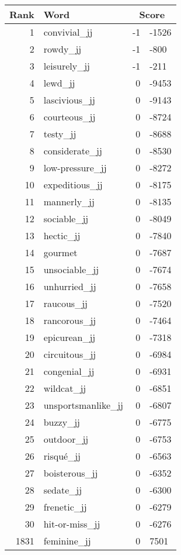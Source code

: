 \begin{longtable}[!htbp]{| rlr@{.}l |}
    \hline
    \textbf{Rank} & \textbf{Word} & \multicolumn{2}{c|}{\textbf{Score}} \\
    \hline
    \endhead
    1 & convivial\_jj & -1 & -1526 \\
    2 & rowdy\_jj & -1 & -800 \\
    3 & leisurely\_jj & -1 & -211 \\
    4 & lewd\_jj & 0 & -9453 \\
    5 & lascivious\_jj & 0 & -9143 \\
    6 & courteous\_jj & 0 & -8724 \\
    7 & testy\_jj & 0 & -8688 \\
    8 & considerate\_jj & 0 & -8530 \\
    9 & low-pressure\_jj & 0 & -8272 \\
    10 & expeditious\_jj & 0 & -8175 \\
    11 & mannerly\_jj & 0 & -8135 \\
    12 & sociable\_jj & 0 & -8049 \\
    13 & hectic\_jj & 0 & -7840 \\
    14 & gourmet & 0 & -7687 \\
    15 & unsociable\_jj & 0 & -7674 \\
    16 & unhurried\_jj & 0 & -7658 \\
    17 & raucous\_jj & 0 & -7520 \\
    18 & rancorous\_jj & 0 & -7464 \\
    19 & epicurean\_jj & 0 & -7318 \\
    20 & circuitous\_jj & 0 & -6984 \\
    21 & congenial\_jj & 0 & -6931 \\
    22 & wildcat\_jj & 0 & -6851 \\
    23 & unsportsmanlike\_jj & 0 & -6807 \\
    24 & buzzy\_jj & 0 & -6775 \\
    25 & outdoor\_jj & 0 & -6753 \\
    26 & risqué\_jj & 0 & -6563 \\
    27 & boisterous\_jj & 0 & -6352 \\
    28 & sedate\_jj & 0 & -6300 \\
    29 & frenetic\_jj & 0 & -6279 \\
    30 & hit-or-miss\_jj & 0 & -6276 \\
    1831 & feminine\_jj & 0 & 7501 \\

\end{longtable}
